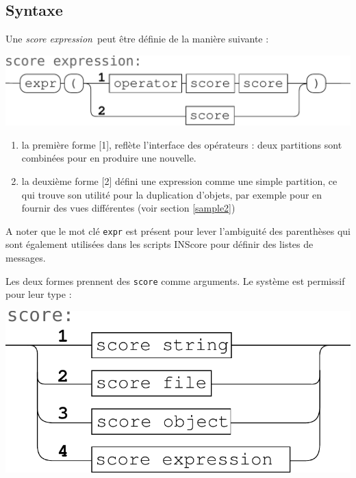 \documentclass{article}
\newcommand{\OSC}[1]	{{\fontsize{10pt}{10pt} \selectfont\texttt{#1}}}
\newcommand{\sExpr}{\emph{score expression}}
\begin{document}
\subsection{Syntaxe}
Une \sExpr\ peut être définie de la manière suivante :
\begin{center}
\includegraphics[width=0.9\columnwidth]{imgs/syntax1}
\end{center}

\begin{enumerate}
\item la première forme [1], reflète l'interface des opérateurs : deux partitions sont combinées pour en produire une nouvelle.
\item la deuxième forme [2] défini une expression comme une simple partition, ce qui trouve son utilité pour la duplication d'objets, par exemple pour en fournir des vues différentes (voir section \ref{sample2})
\end{enumerate}

A noter que le mot clé \OSC{expr} est présent pour lever l'ambiguité des parenthèses qui sont également utilisées dans les scripts INScore pour définir des listes de messages.

Les deux formes prennent des \OSC{score} comme arguments. Le système est permissif pour leur type :
\begin{center}
\includegraphics[width=0.7\columnwidth]{imgs/syntax2}
\end{center}
\end{document}
